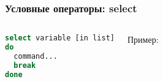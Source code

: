 \begin{frame}[fragile]
\frametitle{Условные операторы: select}

	\small
	\begin{columns}

		\begin{lstlisting}[language=sh,frame=single]
select variable [in list]
do
  command...
  break
done 
\end{lstlisting}
		\pause
		{\normalsize Пример:}

         
		\pause

	\end{columns}
\end{frame}
